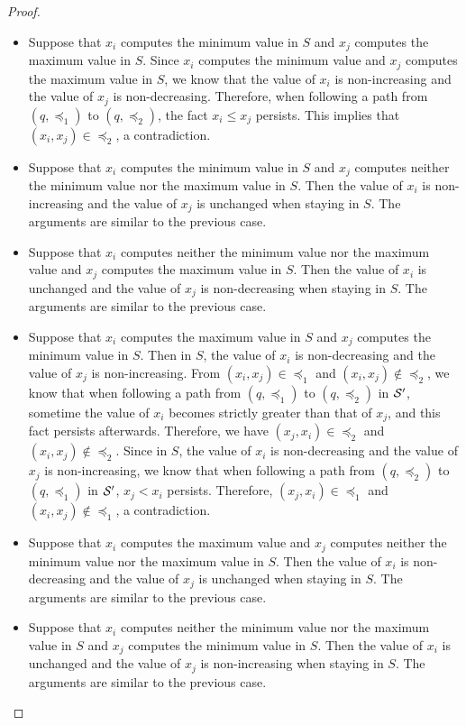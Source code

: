\begin{appendix}
\begin{proof}
\begin{itemize}
%
\item Suppose that $x_i$ computes the minimum value in $S$ and $x_j$ computes the maximum value in $S$. Since $x_i$ computes the minimum value and $x_j$ computes the maximum value in $S$, we know that the value of $x_i$ is non-increasing and the value of $x_j$ is non-decreasing. Therefore, when following a path from $(q, \preceq_1)$ to $(q, \preceq_2)$, the fact $x_i \le x_j$ persists. This implies that $(x_i, x_j) \in \preceq_2$, a contradiction.
%
\item Suppose that $x_i$ computes the minimum value in $S$ and $x_j$ computes neither the minimum value nor the maximum value in $S$. Then the value of $x_i$ is non-increasing and the value of $x_j$ is unchanged when staying in $S$. The arguments are similar to the previous case.
%
\item Suppose that $x_i$ computes neither the minimum value nor the maximum value and $x_j$ computes the maximum value in $S$. Then the value of $x_i$ is unchanged and the value of $x_j$ is non-decreasing when staying in $S$. The arguments are similar to the previous case.
%
\item Suppose that $x_i$ computes the maximum value in $S$ and $x_j$ computes the minimum value in $S$.  Then in $S$, the value of $x_i$ is non-decreasing and the value of $x_j$ is non-increasing.  From $(x_i, x_j) \in \preceq_1$ and $(x_i, x_j) \not \in \preceq_2$, we know that when following a path from $(q, \preceq_1)$ to $(q, \preceq_2)$ in ${\mathcal{S} }'$, sometime the value of $x_i$ becomes strictly greater than that of $x_j$, and this fact persists afterwards. Therefore, we have $(x_j, x_i) \in \preceq_2$ and $(x_i, x_j) \not \in \preceq_2$. Since in $S$, the value of $x_i$ is non-decreasing and the value of $x_j$ is non-increasing, we know that when following a path from $(q, \preceq_2)$ to $(q, \preceq_1)$ in ${\mathcal{S} }'$, $x_j < x_i$ persists. Therefore, $(x_j, x_i) \in \preceq_1$ and $(x_i, x_j) \not \in \preceq_1$, a contradiction.
%
\item Suppose that $x_i$ computes the maximum value and  $x_j$ computes neither the minimum value nor the maximum value in $S$. Then the value of $x_i$ is non-decreasing and the value of $x_j$ is unchanged when staying in $S$. The arguments are similar to the previous case.
%
\item Suppose that $x_i$ computes neither the minimum value nor the maximum value in $S$ and $x_j$ computes the minimum value in $S$. Then the value of $x_i$ is unchanged and the value of $x_j$ is non-increasing when staying in $S$. The arguments are similar to the previous case.

\end{itemize}
\end{proof}
\end{appendix}
